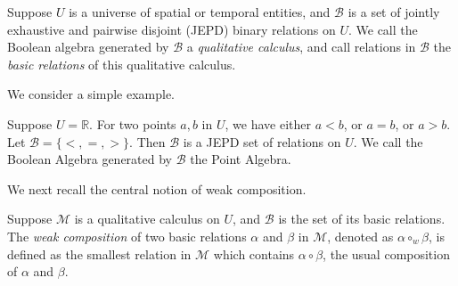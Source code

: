 \documentclass{llncs}
\newcommand{\qcm}{\mathcal{M}}
\begin{document}

\begin{definition}\label{dfn:qc}
Suppose $U$ is a universe of spatial or temporal entities, and $\mathcal{B}$ is a set of jointly exhaustive and pairwise disjoint (JEPD) binary relations on $U$. We call the Boolean algebra generated by $\mathcal{B}$ a \emph{qualitative calculus}, and call relations in $\mathcal{B}$ the \emph{basic relations} of this qualitative calculus.
\end{definition}


We consider a simple example.
\begin{example}
Suppose $U=\mathbb{R}$. For two points $a,b$ in $U$, we have either $a<b$, or $a=b$, or $a>b$. Let $\mathcal{B}=\{<,=,>\}$. Then $\mathcal{B}$ is a JEPD set of relations on $U$. We call the Boolean Algebra generated by $\mathcal{B}$ the Point Algebra.

\end{example}




We next recall the central notion of weak composition.


\begin{definition}\label{dfn:wcomposition}
Suppose $\qcm$ is a qualitative calculus on $U$, and $\mathcal{B}$ is the set of its basic relations. The \emph{weak composition} of two basic relations $\alpha$ and $\beta$ in $\qcm$, denoted as $\alpha\circ_w\beta$, is defined as the smallest relation in $\qcm$ which contains $\alpha\circ\beta$, the usual composition of $\alpha$ and $\beta$.
\end{definition}
\end{document}
